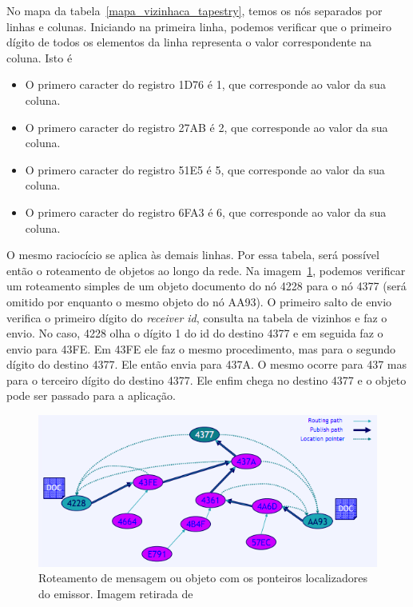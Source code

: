 No mapa da tabela~\ref{mapa_vizinhaca_tapestry}, temos os nós separados por linhas e colunas. Iniciando na primeira linha, podemos verificar que o primeiro dígito de todos os elementos da linha representa o valor correspondente na coluna. Isto é
\begin{itemize}
	\item O primero caracter do registro 1D76 é 1, que corresponde ao valor da sua coluna.
	\item O primero caracter do registro 27AB é 2, que corresponde ao valor da sua coluna.
	\item O primero caracter do registro 51E5 é 5, que corresponde ao valor da sua coluna.
	\item O primero caracter do registro 6FA3 é 6, que corresponde ao valor da sua coluna.
\end{itemize}

O mesmo raciocício se aplica às demais linhas. Por essa tabela, será possível então o roteamento de objetos ao longo da rede. Na imagem~\ref{fig:rede-tapestry}, podemos verificar um roteamento simples de um objeto documento do nó 4228 para o nó 4377 (será omitido por enquanto o mesmo objeto do nó AA93). O primeiro salto de envio verifica o primeiro dígito do \emph{receiver id}, consulta na tabela de vizinhos e faz o envio. No caso, 4228 olha o dígito 1 do id do destino 4377 e em seguida faz o envio para 43FE. Em 43FE ele faz o mesmo procedimento, mas para o segundo dígito do destino 4377. Ele então envia para 437A. O mesmo ocorre para 437 mas para o terceiro dígito do destino 4377. Ele enfim chega no destino 4377 e o objeto pode ser passado para a aplicação.

\begin{figure}
	\centering
	\includegraphics[scale=0.6]{images/rede-tapestry.png}
	\caption{Roteamento de mensagem ou objeto com os ponteiros localizadores do emissor. Imagem retirada de~\cite{welzi11}}
	\label{fig:rede-tapestry}
\end{figure}

